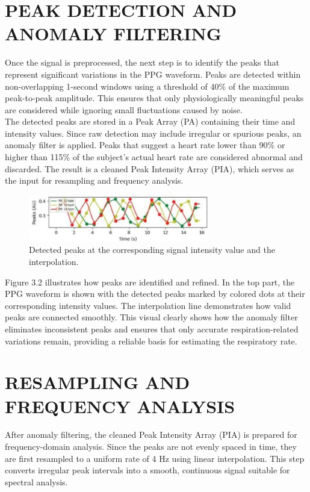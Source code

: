 \documentclass[12pt,a4paper]{report}
\begin{document}
 \section{\large{PEAK DETECTION AND ANOMALY FILTERING}}

 
 Once the signal is preprocessed, the next step is to identify the peaks that represent significant variations in the PPG waveform. Peaks are detected within non-overlapping 1-second windows using a threshold of 40\% of the maximum peak-to-peak amplitude. This ensures that only physiologically meaningful peaks are considered while ignoring small fluctuations caused by noise.\\

 The detected peaks are stored in a Peak Array (PA) containing their time and intensity values. Since raw detection may include irregular or spurious peaks, an anomaly filter is applied. Peaks that suggest a heart rate lower than 90\% or higher than 115\% of the subject’s actual heart rate are considered abnormal and discarded. The result is a cleaned Peak Intensity Array (PIA), which serves as the input for resampling and frequency analysis.
\begin{figure}[H]
    \centering
    \includegraphics[width=0.7\textwidth]{peak detection.jpg}
    \caption{ Detected peaks at the corresponding signal intensity value and the interpolation.
}
    \label{5.10cm}
\end{figure}
 Figure 3.2 illustrates how peaks are identified and refined. In the top part, the PPG waveform is shown with the detected peaks marked by colored dots at their corresponding intensity values. The interpolation line demonstrates how valid peaks are connected smoothly. This visual clearly shows how the anomaly filter eliminates inconsistent peaks and ensures that only accurate respiration-related variations remain, providing a reliable basis for estimating the respiratory rate. 

\section{\large{RESAMPLING AND FREQUENCY ANALYSIS}}


 After anomaly filtering, the cleaned Peak Intensity Array (PIA) is prepared for frequency-domain analysis. Since the peaks are not evenly spaced in time, they are first resampled to a uniform rate of 4 Hz using linear interpolation. This step converts irregular peak intervals into a smooth, continuous signal suitable for spectral analysis.\\
\end{document}
